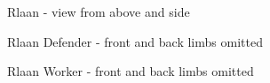 \begin{figure}
\begin{center}
    \caption{Rlaan - view from above and side}
    \label{fig:Rlaan-perspective}
\end{center}
\end{figure}
\begin{figure}
\begin{center}
    \caption{Rlaan Defender - front and back limbs omitted}
    \label{fig:Rlaan-defender-cutaway}
\end{center}
\end{figure}
\begin{figure}
\begin{center}
    \caption{Rlaan Worker - front and back limbs omitted}
    \label{fig:Rlaan-worker-cutaway}
\end{center}
\end{figure}

